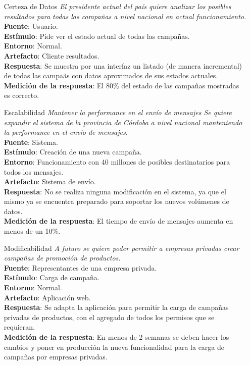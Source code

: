 \documentclass[a4paper, 11pt]{article}
\begin{document}
\begin{itemize}
\item[Certeza de Datos] \textit{El presidente actual del país quiere analizar los posibles resultados para todas las campa\~nas a nivel nacional en actual funcionamiento.}\\
\textbf{Fuente}: Usuario. \\
\textbf{Estímulo}: Pide ver el estado actual de todas las campa\~nas. \\
\textbf{Entorno}: Normal. \\
\textbf{Artefacto}: Cliente resultados. \\
\textbf{Respuesta}: Se muestra por una interfaz un listado (de manera incremental) de todas las campa\~as con datos aproximados de sus estados actuales. \\
\textbf{Medición de la respuesta}: El 80\% del estado de las campa\~nas mostradas es correcto. \\

\item[Escalabilidad] \textit{Mantener la performance en el envío de mensajes
Se quiere expandir el sistema de la provincia de Córdoba a nivel nacional manteniendo la performance en el envio de mensajes.}\\
\textbf{Fuente}: Sistema. \\
\textbf{Estímulo}: Creación de una nueva campa\~na. \\
\textbf{Entorno}: Funcionamiento con 40 millones de posibles destinatarios para todos los mensajes. \\
\textbf{Artefacto}: Sistema de envío. \\
\textbf{Respuesta}: No se realiza ninguna modificación en el sistema, ya que el mismo ya se encuentra preparado para soportar los nuevos volúmenes de datos. \\
\textbf{Medición de la respuesta}: El tiempo de envío de mensajes aumenta en menos de un 10\%.\\

\item[Modificabilidad] \textit{A futuro se quiere poder permitir a empresas privadas crear campa\~nas de promoción de productos.}\\
\textbf{Fuente}: Representantes de una empresa privada. \\
\textbf{Estímulo}: Carga de campa\~na. \\
\textbf{Entorno}: Normal. \\
\textbf{Artefacto}: Aplicación web. \\
\textbf{Respuesta}: Se adapta la aplicación para permitir la carga de campa\~nas privadas de productos, con el agregado de todos los permisos que se requieran. \\
\textbf{Medición de la respuesta}: En menos de 2 semanas se deben hacer los cambios y poner en producción la nueva funcionalidad para la carga de campa\~nas por empresas privadas. \\


\end{itemize}
\end{document}
